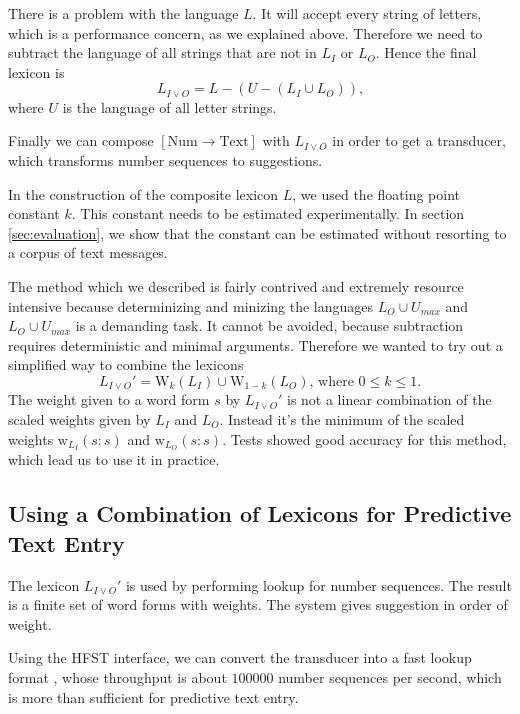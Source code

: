 \documentclass[a4paper,conference]{IEEEtran}
\begin{document}
There is a problem with the language $L$. It will accept every
string of letters, which is a performance concern, as we explained
above. Therefore we need to subtract the language of all strings that
are not in $L_I$ or $L_O$. Hence the final lexicon is
\begin{equation}L_{I\vee O} = L - (U - (L_I \cup L_O))\text{,}\end{equation}
where $U$ is the language of all letter strings.

Finally we can compose $[\mathrm{Num}\rightarrow\mathrm{Text}]$ with
$L_{I\vee O}$ in order to get a transducer, which transforms number
sequences to suggestions.

In the construction of the composite lexicon $L$, we used the floating
point constant $k$. This constant needs to be estimated
experimentally. In section \ref{sec:evaluation}, we show that the
constant can be estimated without resorting to a corpus of text messages.

The method which we described is fairly contrived and extremely
resource intensive because determinizing and minizing the languages
$L_O \cup U_{max}$ and $L_O \cup U_{max}$ is a demanding task. It
cannot be avoided, because subtraction requires deterministic and
minimal arguments. Therefore we wanted to try out a simplified way to
combine the lexicons
\begin{equation}
  L_{I\vee O}' = \mathrm{W}_k(L_I) \cup \mathrm{W}_{1-k}(L_O)\text{, where }0 \leq k \leq 1\text{.}
\end{equation} 
The weight given to a word form $s$ by $L_{I\vee O}'$ is not a linear
combination of the scaled weights given by $L_I$ and $L_O$. Instead
it's the minimum of the scaled weights
$\mathrm{w}_{L_I}(s\mathrm{:}s)$ and $\mathrm{w}_{L_O}(s\mathrm{:}s)$.
Tests showed good accuracy for this method, which lead us to use it in
practice.

\subsection{Using a Combination of Lexicons for Predictive Text Entry}

The lexicon $L_{I\vee O}'$ is used by performing lookup for number
sequences. The result is a finite set of word forms with weights. The
system gives suggestion in order of weight.

Using the HFST interface, we can convert the transducer into a fast
lookup format \cite{conf/fsmnlp/Silfverberg2009}, whose throughput is
about $100000$ number sequences per second, which is more than
sufficient for predictive text entry.
\end{document}
